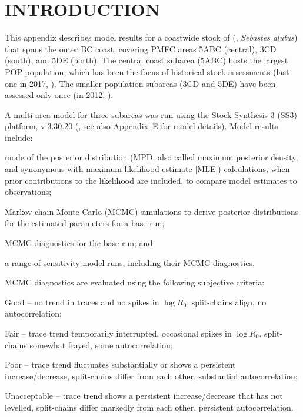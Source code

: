 \documentclass[11pt]{book}
\newcommand{\AppEqn}{Appendix~E}
\begin{document}
\section{INTRODUCTION}

This appendix describes model results for a coastwide stock of \SPP{} (\SPC, \emph{Sebastes alutus}) that spans the outer BC coast, covering PMFC areas 5ABC (central), 3CD (south), and 5DE (north).
The central coast subarea (5ABC) hosts the largest POP population, which has been the focus of historical stock assessments (last one in 2017, \citealt{Haigh-etal:2018_pop5ABC}).
The smaller-population subareas (3CD and 5DE) have been assessed only once (in 2012, \citealt{Edwards-etal:2014_pop5DE, Edwards-etal:2014_pop3CD}).

A multi-area model for three subareas was run using the Stock Synthesis 3 (SS3) platform, v.3.30.20 (\citealt{Methot-etal:2022}, see also \AppEqn{} for model details).
Model results include:
\vspace{-0.5\baselineskip}
\begin{itemize_csas}{}{}
\item mode of the posterior distribution (MPD, also called maximum posterior density, and synonymous with maximum likelihood estimate [MLE]) calculations, when prior contributions to the likelihood are included, to compare model estimates to observations;
\item Markov chain Monte Carlo (MCMC) simulations to derive posterior distributions for the estimated parameters for a base run;
\item MCMC diagnostics for the base run; and
\item a range of sensitivity model runs, including their MCMC diagnostics.
\end{itemize_csas}
MCMC diagnostics are evaluated using the following subjective criteria:
\begin{itemize_csas}{}{}
  \item Good -- no trend in traces and no spikes in $\log R_0$, split-chains align, no autocorrelation;
  \item Fair -- trace trend temporarily interrupted, occasional spikes in $\log R_0$, split-chains somewhat frayed, some autocorrelation;
  \item Poor -- trace trend fluctuates substantially or shows a persistent increase/decrease, split-chains differ from each other, substantial autocorrelation;
  \item Unacceptable -- trace trend shows a persistent increase/decrease that has not levelled, split-chains differ markedly from each other, persistent autocorrelation.
\end{itemize_csas}
\end{document}
